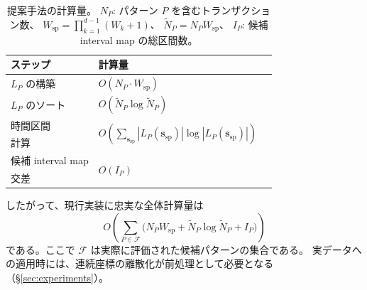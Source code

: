 \begin{table}[t]
\centering
\caption{提案手法の計算量。
$N_P$: パターン $P$ を含むトランザクション数、
$W_{\mathrm{sp}} = \prod_{k=1}^{d-1} (W_k + 1)$、
$\widetilde N_P = N_P W_{\mathrm{sp}}$、
$I_P$: 候補 interval map の総区間数。}
\label{tab:complexity}
\small
\begin{tabular}{lll}
\toprule
ステップ & 計算量 \\
\midrule
$L_P$ の構築 & $O(N_P \cdot W_{\mathrm{sp}})$ \\
$L_P$ のソート & $O(\widetilde N_P \log \widetilde N_P)$ \\
時間区間 & \multirow{2}{*}{$O\!\left(\sum_{\bm{s}_{\mathrm{sp}}}|L_P(\bm{s}_{\mathrm{sp}})| \log |L_P(\bm{s}_{\mathrm{sp}})|\right)$} \\
\quad 計算 & \\
候補 interval map & \multirow{2}{*}{$O(I_P)$} \\
\quad 交差 & \\
\bottomrule
\end{tabular}
\end{table}

したがって、現行実装に忠実な全体計算量は
\[
  O\!\left(
    \sum_{P \in \mathcal{F}}
      \bigl(
        N_P W_{\mathrm{sp}}
        +
        \widetilde N_P \log \widetilde N_P
        +
        I_P
      \bigr)
  \right)
\]
である。ここで $\mathcal{F}$ は実際に評価された候補パターンの集合である。
実データへの適用時には、連続座標の離散化が前処理として必要となる（\S\ref{sec:experiments}）。
